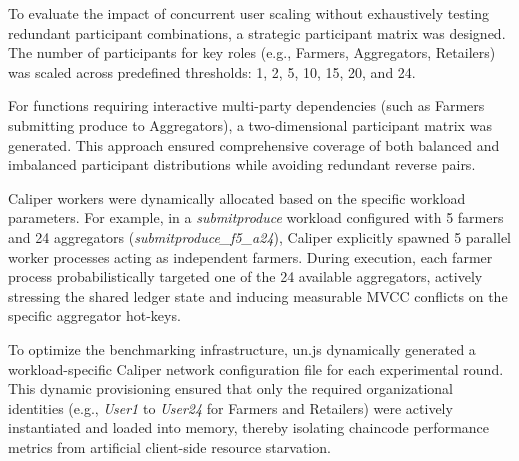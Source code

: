 \documentclass[12pt]{article}
\begin{document}
To evaluate the impact of concurrent user scaling without exhaustively testing redundant participant combinations, a strategic participant matrix was designed. The number of participants for key roles (e.g., Farmers, Aggregators, Retailers) was scaled across predefined thresholds: 1, 2, 5, 10, 15, 20, and 24. 

For functions requiring interactive multi-party dependencies (such as Farmers submitting produce to Aggregators), a two-dimensional participant matrix was generated. This approach ensured comprehensive coverage of both balanced and imbalanced participant distributions while avoiding redundant reverse pairs.

Caliper workers were dynamically allocated based on the specific workload parameters. For example, in a \textit{submitproduce} workload configured with 5 farmers and 24 aggregators (\textit{submitproduce\_f5\_a24}), Caliper explicitly spawned 5 parallel worker processes acting as independent farmers. During execution, each farmer process probabilistically targeted one of the 24 available aggregators, actively stressing the shared ledger state and inducing measurable MVCC conflicts on the specific aggregator hot-keys.

To optimize the benchmarking infrastructure, 
un.js dynamically generated a workload-specific Caliper network configuration file for each experimental round. This dynamic provisioning ensured that only the required organizational identities (e.g., \textit{User1} to \textit{User24} for Farmers and Retailers) were actively instantiated and loaded into memory, thereby isolating chaincode performance metrics from artificial client-side resource starvation.

\begin{table}[ht]
\centering
\caption{Benchmark Workload Configurations and Participant Mapping}
\label{tab:workload_mapping}
\end{table}
\end{document}
